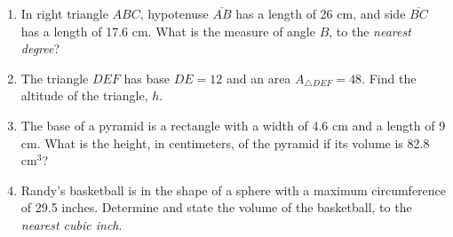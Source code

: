 \documentclass[12pt, twoside]{article}
\begin{document}
\begin{enumerate}
  \item In right triangle $ABC$, hypotenuse $\overline{AB}$ has a length of 26 cm, and side $\overline{BC}$ has a length of 17.6 cm. What is the measure of angle $B$, to the \emph{nearest degree}?

\newpage

   \item The triangle $DEF$ has base $DE=12$ and an area $A_{\triangle DEF}= 48$. Find the altitude of the triangle, $h$.\\[0.5cm]
    \vspace{3.0cm}

  \item The base of a pyramid is a rectangle with a width of 4.6 cm and a length of 9 cm. What is the height, in centimeters, of the pyramid if its volume is 82.8 $\mathrm{cm}^3$? \vspace{4.0cm}

  \item Randy’s basketball is in the shape of a sphere with a maximum circumference of 29.5 inches. Determine and state the volume of the basketball, to the \emph{nearest cubic inch}.

  \end{enumerate}
  \newpage
  \setcounter{page}{1}
\end{document}
